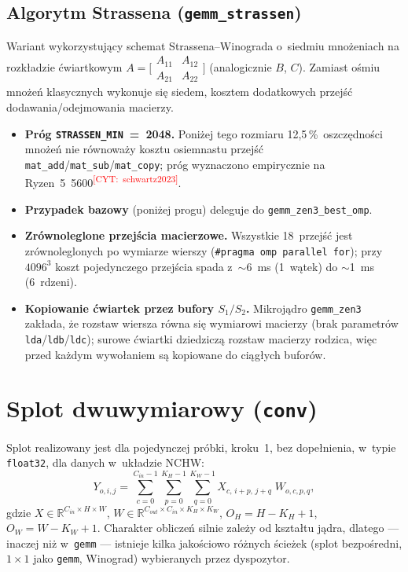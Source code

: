 \documentclass[a4paper,12pt]{book} %
\newcommand{\todocite}[1]{\textsuperscript{\textcolor{red}{[CYT:~#1]}}}
\newcommand{\kod}[1]{\texttt{#1}}
\begin{document}
\subsection{Algorytm Strassena (\kod{gemm\_strassen})}
Wariant wykorzystujący schemat Strassena--Winograda o~siedmiu mnożeniach na
rozkładzie ćwiartkowym $A=\bigl[\begin{smallmatrix}A_{11}&A_{12}\\A_{21}&A_{22}\end{smallmatrix}\bigr]$
(analogicznie $B$, $C$). Zamiast ośmiu mnożeń klasycznych wykonuje się siedem,
kosztem dodatkowych przejść dodawania/odejmowania macierzy.
\begin{itemize}
\item \textbf{Próg \kod{STRASSEN\_MIN}~=~2048.} Poniżej tego rozmiaru
  12,5\,\%~oszczędności mnożeń nie równoważy kosztu osiemnastu przejść
  \kod{mat\_add}/\kod{mat\_sub}/\kod{mat\_copy}; próg wyznaczono empirycznie na
  Ryzen~5~5600\todocite{schwartz2023}.
\item \textbf{Przypadek bazowy} (poniżej progu) deleguje do
  \kod{gemm\_zen3\_best\_omp}.
\item \textbf{Zrównoleglone przejścia macierzowe.} Wszystkie 18~przejść jest
  zrównoleglonych po wymiarze wierszy (\kod{\#pragma omp parallel for}); przy
  $4096^3$ koszt pojedynczego przejścia spada z~$\sim$6~ms (1~wątek) do
  $\sim$1~ms (6~rdzeni).
\item \textbf{Kopiowanie ćwiartek przez bufory $S_1/S_2$.} Mikrojądro
  \kod{gemm\_zen3} zakłada, że rozstaw wiersza równa się wymiarowi macierzy
  (brak parametrów \kod{lda}/\kod{ldb}/\kod{ldc}); surowe ćwiartki dziedziczą
  rozstaw macierzy rodzica, więc przed każdym wywołaniem są kopiowane do ciągłych
  buforów.
\end{itemize}

\section{Splot dwuwymiarowy (\kod{conv})}
\label{sec:conv}

Splot realizowany jest dla pojedynczej próbki, kroku~1, bez dopełnienia, w~typie
\kod{float32}, dla danych w~układzie NCHW:
\begin{equation}
Y_{o,i,j} = \sum_{c=0}^{C_{in}-1}\sum_{p=0}^{K_H-1}\sum_{q=0}^{K_W-1}
            X_{c,\,i+p,\,j+q}\; W_{o,c,p,q},
\label{eq:conv}
\end{equation}
gdzie $X\in\mathbb{R}^{C_{in}\times H\times W}$,
$W\in\mathbb{R}^{C_{out}\times C_{in}\times K_H\times K_W}$,
$O_H=H-K_H+1$, $O_W=W-K_W+1$. Charakter obliczeń silnie zależy od kształtu jądra,
dlatego --- inaczej niż w~\kod{gemm} --- istnieje kilka jakościowo różnych ścieżek
(splot bezpośredni, $1\times1$ jako \kod{gemm}, Winograd) wybieranych przez
dyspozytor.
\end{document}
